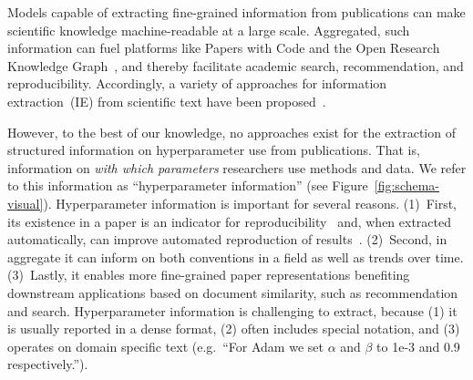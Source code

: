
Models capable of extracting fine-grained information from publications can make scientific knowledge machine-readable at a large scale.
Aggregated, such information can fuel platforms like Papers with Code and the Open Research Knowledge Graph~\cite{orkg1,orkg2}, and thereby facilitate academic search, recommendation,  and reproducibility.
Accordingly, a variety of approaches for information extraction~(IE) from scientific text have been proposed~\cite{luan2018scierc,Jain2020scirex,semeval21_task8,semeval22_task12,Dunn2022}.  %


However, to the best of our knowledge, no approaches exist for the extraction of structured information on hyperparameter use from publications.
That is, information on \emph{with which parameters} researchers use methods and data. We refer to this information as ``hyperparameter information'' (see Figure~\ref{fig:schema-visual}).
Hyperparameter information is important for several reasons. (1)~First, its existence in a paper is an indicator for reproducibility~\cite{Radd2019} and, when extracted automatically, can improve automated reproduction of results~\cite{sethi2018}. (2)~Second, in aggregate it can inform on both conventions in a field as well as trends over time. (3)~Lastly, it enables more fine-grained paper representations benefiting downstream applications based on document similarity, such as recommendation and search. %
Hyperparameter information is challenging to extract, because (1) it is usually reported in a dense format, (2) often includes special notation, and (3) operates on domain specific text (e.g.\ ``For Adam we set $\alpha$ and $\beta$ to 1e-3 and 0.9 respectively.'').

